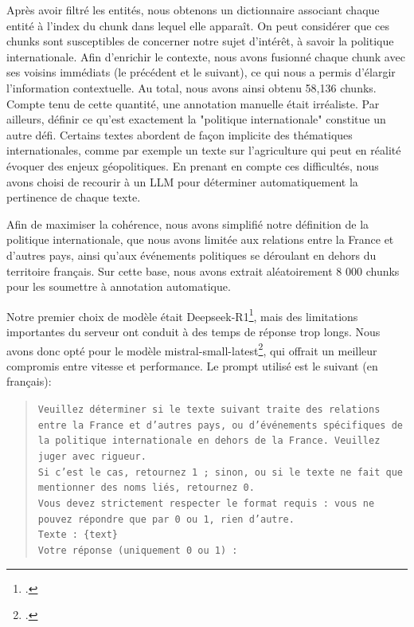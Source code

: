 \documentclass[a4paper,twoside,12pt]{book}
\begin{document}
Après avoir filtré les entités, nous obtenons un dictionnaire associant chaque entité à l'index du chunk dans lequel elle apparaît. On peut considérer que ces chunks sont susceptibles de concerner notre sujet d'intérêt, à savoir la politique internationale. Afin d'enrichir le contexte, nous avons fusionné chaque chunk avec ses voisins immédiats (le précédent et le suivant), ce qui nous a permis d'élargir l'information contextuelle. Au total, nous avons ainsi obtenu 58,136 chunks. Compte tenu de cette quantité, une annotation manuelle était irréaliste. Par ailleurs, définir ce qu'est exactement la "politique internationale" constitue un autre défi. Certains textes abordent de façon implicite des thématiques internationales, comme par exemple un texte sur l'agriculture qui peut en réalité évoquer des enjeux géopolitiques. En prenant en compte ces difficultés, nous avons choisi de recourir à un LLM pour déterminer automatiquement la pertinence de chaque texte.

Afin de maximiser la cohérence, nous avons simplifié notre définition de la politique internationale, que nous avons limitée aux relations entre la France et d'autres pays, ainsi qu'aux événements politiques se déroulant en dehors du territoire français. Sur cette base, nous avons extrait aléatoirement 8 000 chunks pour les soumettre à annotation automatique.

Notre premier choix de modèle était Deepseek-R1\footcite{deepseek-ai2025}, mais des limitations importantes du serveur ont conduit à des temps de réponse trop longs. Nous avons donc opté pour le modèle mistral-small-latest\footcite{zotero-743}, qui offrait un meilleur compromis entre vitesse et performance. Le prompt utilisé est le suivant (en français):

\begin{quote}
\small
\texttt{Veuillez déterminer si le texte suivant traite des relations entre la France et d'autres pays, ou d'événements spécifiques de la politique internationale en dehors de la France. Veuillez juger avec rigueur.\\
Si c'est le cas, retournez 1 ; sinon, ou si le texte ne fait que mentionner des noms liés, retournez 0.\\
Vous devez strictement respecter le format requis : vous ne pouvez répondre que par 0 ou 1, rien d'autre.\\
Texte : \{text\}\\
Votre réponse (uniquement 0 ou 1) :}
\end{quote}
\end{document}
